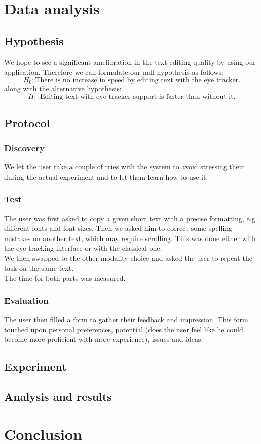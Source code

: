 \documentclass[12pt, a4paper, twoside]{article}
\begin{document}
\section{Data analysis}

\subsection{Hypothesis}
We hope to see a significant amelioration in the text editing quality by using our application. Therefore we can formulate our null hypothesis as follows: 
\[H_0: \text{There is no increase in speed by editing text with the eye tracker.}\] 
along with the alternative hypothesis: 
\[H_1: \text{Editing text with eye tracker support is faster than without it.}\]

\subsection{Protocol}

\subsubsection{Discovery}
We let the user take a couple of tries with the system to avoid stressing them during the actual experiment and to let them learn how to use it. 

\subsubsection{Test}
The user was first asked to copy a given short text with a precise formatting, e.g. different fonts and font sizes. Then we asked him to correct some spelling mistakes on another text, which may require scrolling. This was done either with the eye-tracking interface or with the classical one. \\
We then swapped to the other modality choice and asked the user to repeat the task on the same text. \\
The time for both parts was measured. 

\subsubsection{Evaluation}
The user then filled a form to gather their feedback and impression. This form touched upon personal preferences, potential (does the user feel like he could become more proficient with more experience), issues and ideas. 

\subsection{Experiment}

\subsection{Analysis and results}


\section{Conclusion}
 
\end{document}
